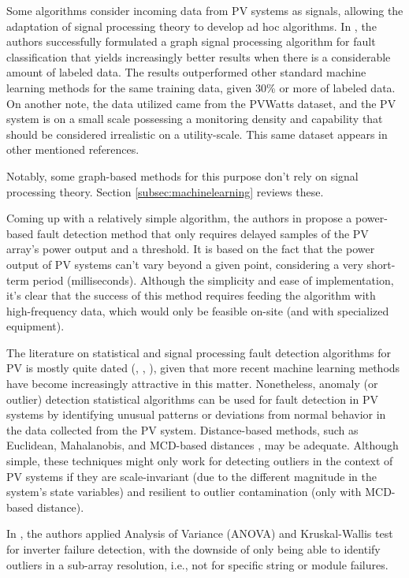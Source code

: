 Some algorithms consider incoming data from PV systems as signals, allowing the adaptation of signal processing theory to develop ad hoc algorithms. In \cite{Fan2020}, the authors successfully formulated a graph signal processing algorithm for fault classification that yields increasingly better results when there is a considerable amount of labeled data. The results outperformed other standard machine learning methods for the same training data, given 30\% or more of labeled data. On another note, the data utilized came from the PVWatts \cite{Dobos2013} dataset, and the PV system is on a small scale possessing a monitoring density and capability that should be considered irrealistic on a utility-scale. This same dataset appears in other mentioned references.

Notably, some graph-based methods for this purpose don't rely on signal processing theory. Section \ref{subsec:machinelearning} reviews these.

Coming up with a relatively simple algorithm, the authors in \cite{Iles2021} propose a power-based fault detection method that only requires delayed samples of the PV array's power output and a threshold. It is based on the fact that the power output of PV systems can't vary beyond a given point, considering a very short-term period (milliseconds). Although the simplicity and ease of implementation, it's clear that the success of this method requires feeding the algorithm with high-frequency data, which would only be feasible on-site (and with specialized equipment).

The literature on statistical and signal processing fault detection algorithms for PV is mostly quite dated (\cite{Buddha2012}, \cite{Zhao2014}, \cite{Vergura2008}), given that more recent machine learning methods have become increasingly attractive in this matter. Nonetheless, anomaly (or outlier) detection statistical algorithms can be used for fault detection in PV systems by identifying unusual patterns or deviations from normal behavior in the data collected from the PV system. Distance-based methods, such as Euclidean, Mahalanobis, and MCD-based distances \cite{Braun2011}, may be adequate. Although simple, these techniques might only work for detecting outliers in the context of PV systems if they are scale-invariant (due to the different magnitude in the system's state variables) and resilient to outlier contamination (only with MCD-based distance).

In \cite{Vergura2008}, the authors applied Analysis of Variance (ANOVA) and Kruskal-Wallis test for inverter failure detection, with the downside of only being able to identify outliers in a sub-array resolution, i.e., not for specific string or module failures.

